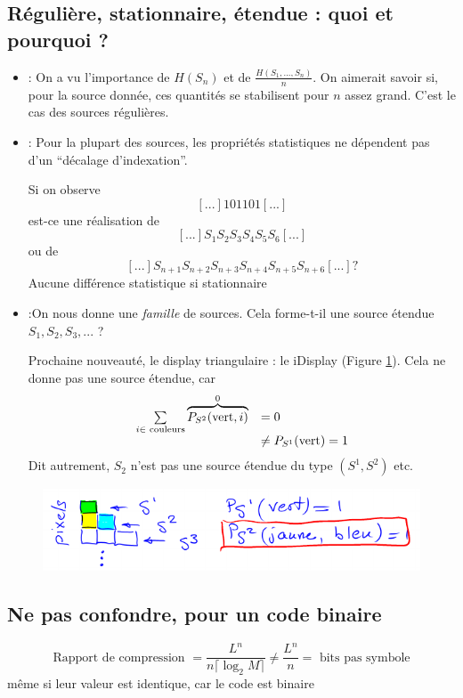\documentclass[11pt,a4paper]{article}
\renewcommand{\)}{\right)}
\renewcommand{\(}{\left(}
\begin{document}
\subsection[Récapitulation types sources]{Régulière, stationnaire, étendue : quoi et pourquoi ?}
\begin{itemize}
	\item {} : On a vu l'importance de $H(S_n)$ et de $\frac{H(S_1,...,S_n)}{n}$. On aimerait savoir si, pour la source donnée, ces quantités se stabilisent pour $n$ assez grand. C'est le cas des sources régulières.
	\item {} : Pour la plupart des sources, les propriétés statistiques ne dépendent pas d'un \enquote{décalage d'indexation}.
			\begin{exemple}
				Si on observe \[[...]101101[...]\] est-ce une réalisation de \[[...]S_1S_2S_3S_4S_5S_6[...]\] ou de \[[...]S_{n+1}S_{n+2}S_{n+3}S_{n+4}S_{n+5}S_{n+6}[...] ?\]
				Aucune différence statistique si stationnaire
			\end{exemple}
	\item 	{} :On nous donne une \textit{famille} de sources. Cela forme-t-il une source étendue $S_1,S_2,S_3,...$ ?
			\begin{exemple}
				Prochaine nouveauté, le display triangulaire : le iDisplay (Figure \ref{etendue}). Cela ne donne pas une source étendue, car \[\begin{array}{ll}
					\sum\limits_{i\in \text{ couleurs}}^{} \overbrace{P_{S^2}(\text{vert}, i)}^0 & = 0\\
						& \neq P_{S^1}(\text{vert}) = 1
				\end{array}
				\]
				Dit autrement, $S_2$ n'est pas une source étendue du type $(S^1,S^2)$ etc.
			\end{exemple}
\end{itemize} 			
\begin{figure}[!h]
	\centering
	\includegraphics[scale=0.5]{images/etendue}
	\caption{}
	\label{etendue}
\end{figure}

\subsection[Ne pas Confondre]{Ne pas confondre, pour un code binaire}
\[\text{Rapport de compression } = \frac{L^n}{n\lceil \log_2 M\rceil} \neq \frac{L^n}{n} = \text{ bits pas symbole}\]
même si leur valeur est identique, car le code est binaire
\newpage
\end{document}
